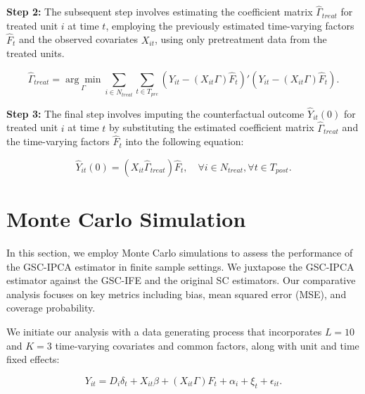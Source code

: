 \documentclass[12pt]{article}
\begin{document}
\textbf{Step 2:} The subsequent step involves estimating the coefficient matrix $\hat{\Gamma}_{treat}$ for treated unit $i$ at time $t$, employing the previously estimated time-varying factors $\hat{F}_t$ and the observed covariates $X_{it}$, using only pretreatment data from the treated units.

\begin{equation}
\hat{\Gamma}_{treat} = \underset{\Gamma}{\arg\min} \sum_{i \in N_{treat}} \sum_{t \in T_{pre}} \left( Y_{it} - (X_{it} \Gamma) \hat{F}_{t} \right)' \left( Y_{it} - (X_{it} \Gamma) \hat{F}_{t} \right).
\tag{4}
\end{equation}

\textbf{Step 3:} The final step involves imputing the counterfactual outcome $\hat{Y}_{it}(0)$ for treated unit $i$ at time $t$ by substituting the estimated coefficient matrix $\hat{\Gamma}_{treat}$ and the time-varying factors $\hat{F}_t$ into the following equation:

\begin{equation}
\hat{Y}_{it}(0) = (X_{it} \hat{\Gamma}_{treat}) \hat{F}_{t}, \quad \forall i \in N_{treat}, \forall t \in T_{post}.
\tag{5}
\end{equation}
\section{Monte Carlo Simulation}
\label{sec: simulation}

In this section, we employ Monte Carlo simulations to assess the performance of the GSC-IPCA estimator in finite sample settings. We juxtapose the GSC-IPCA estimator against the GSC-IFE and the original SC estimators. Our comparative analysis focuses on key metrics including bias, mean squared error (MSE), and coverage probability. 

We initiate our analysis with a data generating process that incorporates $L=10$ and $K=3$ time-varying covariates and common factors, along with unit and time fixed effects:

\begin{equation}
Y_{it} = D_{i} \delta_{t} + X_{it}\beta + (X_{it}\Gamma) F_{t} + \alpha_i + \xi_t + \epsilon_{it}.
\tag{6}
\label{eq: dgp}
\end{equation}
\end{document}
